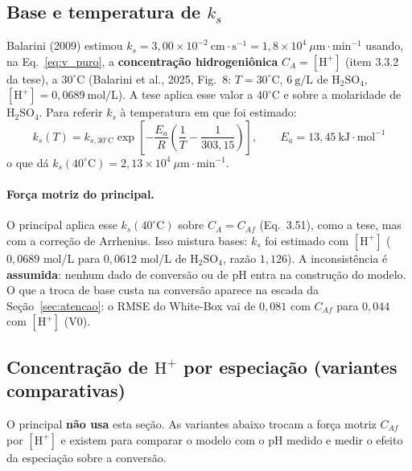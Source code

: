 \documentclass[12pt,a4paper]{article}
\begin{document}
\subsection{Base e temperatura de $k_s$}
Balarini (2009) estimou $k_s = 3{,}00 \times 10^{-2}\ \text{cm}\cdot\text{s}^{-1} = 1{,}8 \times 10^4\ \mu\text{m}\cdot\text{min}^{-1}$ usando, na Eq.~\eqref{eq:v_puro}, a \textbf{concentração hidrogeniônica} $C_A = [\text{H}^+]$ (item 3.3.2 da tese), a \textbf{$30^\circ\text{C}$} (Balarini et al., 2025, Fig.~8: $T = 30^\circ\text{C}$, $6\ \text{g/L}$ de $\text{H}_2\text{SO}_4$, $[\text{H}^+] = 0{,}0689\ \text{mol/L}$). A tese aplica esse valor a $40^\circ\text{C}$ e sobre a molaridade de $\text{H}_2\text{SO}_4$. Para referir $k_s$ à temperatura em que foi estimado:
\begin{equation}
    k_s(T) = k_{s,30^\circ\text{C}} \exp \left[ -\frac{E_a}{R} \left( \frac{1}{T} - \frac{1}{303{,}15} \right) \right], \qquad E_a = 13{,}45\ \text{kJ}\cdot\text{mol}^{-1}
\end{equation}
o que dá $k_s(40^\circ\text{C}) = 2{,}13 \times 10^4\ \mu\text{m}\cdot\text{min}^{-1}$.

\paragraph{Força motriz do principal.} O principal aplica esse $k_s(40^\circ\text{C})$ sobre $C_A = C_{Af}$ (Eq.~3.51), como a tese, mas com a correção de Arrhenius. Isso mistura bases: $k_s$ foi estimado com $[\text{H}^+]$ ($0{,}0689$ mol/L para $0{,}0612$ mol/L de $\text{H}_2\text{SO}_4$, razão $1{,}126$). A inconsistência é \textbf{assumida}: nenhum dado de conversão ou de pH entra na construção do modelo. O que a troca de base custa na conversão aparece na escada da Seção~\ref{sec:atencao}: o RMSE do White-Box vai de $0{,}081$ com $C_{Af}$ para $0{,}044$ com $[\text{H}^+]$ (V0).

\subsection{Concentração de $\text{H}^+$ por especiação (variantes comparativas)}
O principal \textbf{não usa} esta seção. As variantes abaixo trocam a força motriz $C_{Af}$ por $[\text{H}^+]$ e existem para comparar o modelo com o pH medido e medir o efeito da especiação sobre a conversão.
\end{document}
